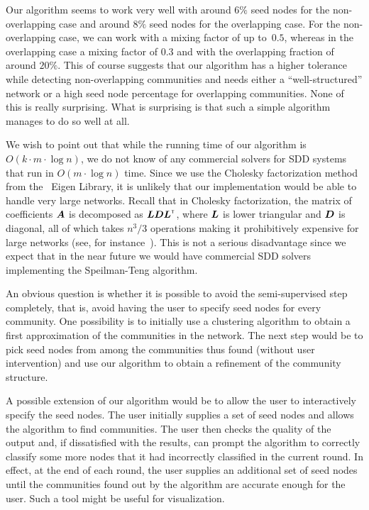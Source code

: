 Our algorithm seems to work very well with around 6$\%$ seed nodes for the 
non-overlapping case and around 8$\%$ seed nodes for the overlapping case. 
For the non-overlapping case, we can work with a mixing factor of up 
to~$0.5$, whereas in the overlapping case a mixing factor of $0.3$ 
and with the overlapping fraction of around $20\%$. This of course 
suggests that our algorithm has a higher tolerance while detecting 
non-overlapping communities and needs either a ``well-structured''
network or a high seed node percentage for overlapping communities. 
None of this is really surprising. What is surprising is that such 
a simple algorithm manages to do so well at all.

We wish to point out that while the running time of our algorithm is 
$O(k \cdot m \cdot \log n)$, we do not know of any commercial solvers 
for SDD systems that run in $O(m \cdot \log n)$ time. Since we use the Cholesky 
factorization method from the \CPP\ Eigen Library, it is unlikely that our 
implementation would be able to handle very large networks. Recall that 
in Cholesky factorization, the matrix of coefficients $\boldsymbol{A}$ is decomposed 
as $\boldsymbol{L} \boldsymbol{D} {\boldsymbol{L}}^{\scriptscriptstyle \mathsf{T}}$, where $\boldsymbol{L}$ is lower triangular 
and $\boldsymbol{D}$ is diagonal, all of which takes $n^3/3$ operations making it 
prohibitively expensive for large networks (see, for instance~\cite{GvL13}). 
This is not a serious disadvantage since we expect that in the near future 
we would have commercial SDD solvers implementing the Speilman-Teng algorithm. 

An obvious question is whether it is possible to avoid the semi-supervised 
step completely, that is, avoid having the user to specify seed nodes 
for every community. One possibility is to initially use a clustering 
algorithm to obtain a first approximation of the communities in the network. 
The next step would be to pick seed nodes from among the communities thus found 
(without user intervention) and use our algorithm to obtain a refinement of the 
community structure. 


A possible extension of our algorithm would be to allow the user to interactively 
specify the seed nodes. The user initially supplies a set of seed nodes 
and allows the algorithm to find communities. The user then checks the 
quality of the output and, if dissatisfied with the results, can prompt the algorithm 
to correctly classify some more nodes that it had incorrectly classified in the current round. 
In effect, at the end of each round, the user supplies an additional set of seed nodes until the 
communities found out by the algorithm are accurate enough for the user. Such a tool 
might be useful for visualization.


